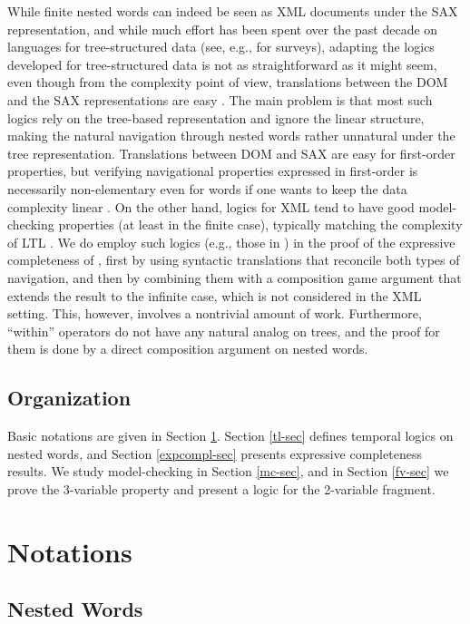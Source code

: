 \documentclass{LMCS}
\theoremstyle{plain}
\theoremstyle{definition}
\begin{document}
While finite nested words can indeed be seen as XML documents under
the SAX representation, and while much effort has been spent over the
past decade on languages for tree-structured data (see,
e.g., \cite{KSS03,Lib05,vianu-pods} for surveys), adapting the logics
developed for tree-structured data is not as straightforward as it
might seem, even though from the complexity point of view,
translations between the DOM and the SAX representations are easy
\cite{luc-pods03}.  The main problem is that most such logics rely on
the tree-based representation and ignore the linear structure, making
the natural navigation through nested words rather unnatural under the
tree representation. Translations between DOM and SAX are easy for
first-order properties, but verifying navigational properties
expressed in first-order is necessarily non-elementary even for words
if one wants to keep the data complexity linear \cite{FG02}.  On the
other hand, logics for XML tend to have good model-checking properties
(at least in the finite case), typically matching the complexity of
LTL \cite{GK-jacm,neven00}.  We do employ such logics (e.g., those in
\cite{marx-pods04,marx-tods,Schl92}) in the proof of the expressive
completeness of , first by using syntactic translations that
reconcile both types of navigation, and then by combining them with a
composition game argument that extends the result to the infinite
case, which is not considered in the XML setting. This, however,
involves a nontrivial amount of work. Furthermore, ``within''
operators do not have any natural analog on trees, and the proof for
them is done by a direct composition argument on nested words.


\subsection*{Organization}
Basic notations are given in Section \ref{notations-sec}. Section
\ref{tl-sec} defines temporal logics on nested words, and Section
\ref{expcompl-sec} presents expressive completeness results. We study
model-checking in Section \ref{mc-sec}, and in Section \ref{fv-sec} we
prove the 3-variable property and present a logic for the 2-variable
fragment. 


\section{Notations} 
\label{notations-sec}

\subsection{Nested Words}
\end{document}
